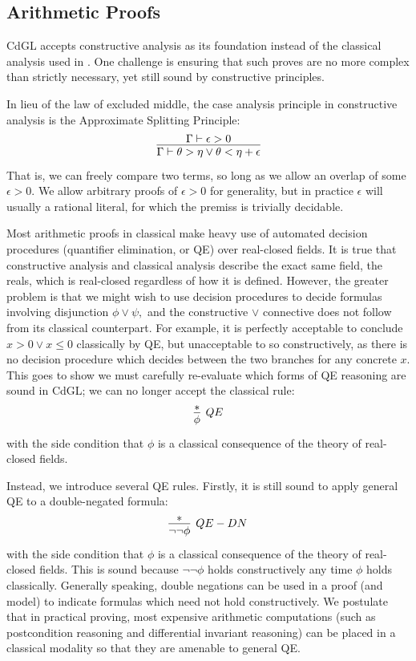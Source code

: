 \documentclass[12pt]{cmuthesis}
\theoremstyle{definition}
\theoremstyle{remark}
\newcommand{\CdGL}{\textsf{CdGL}\xspace}
\begin{document}
\subsection{Arithmetic Proofs}
\CdGL accepts constructive analysis as its foundation instead of the classical analysis used in \dGL.
One challenge is ensuring that such proves are no more complex than strictly necessary, yet still sound by constructive principles.

In lieu of the law of excluded middle, the case analysis principle in constructive analysis is the Approximate Splitting Principle:
\[\infer{\Gamma \vdash \theta > \eta \lor \theta < \eta + \epsilon}{\Gamma \vdash \epsilon > 0}\]
That is, we can freely compare two terms, so long as we allow an overlap of some $\epsilon > 0$.
We allow arbitrary proofs of $\epsilon > 0$ for generality, but in practice $\epsilon$ will usually a rational literal, for which the premiss is trivially decidable.

Most arithmetic proofs in classical \dGL make heavy use of automated decision procedures (quantifier elimination, or QE) over real-closed fields.
It is true that constructive analysis and classical analysis describe the exact same field, the reals, which is real-closed regardless of how it is defined.
However, the greater problem is that we might wish to use decision procedures to decide formulas involving disjunction $\phi \lor \psi,$ and the constructive $\lor$ connective does not follow from its classical counterpart.
For example, it is perfectly acceptable to conclude $x > 0 \lor x \leq 0$ classically by QE, but unacceptable to so constructively, as there is no decision procedure which decides between the two branches for any concrete $x$.
This goes to show we must carefully re-evaluate which forms of QE reasoning are sound in \CdGL; we can no longer accept the classical rule:
\[\infer[QE]{\phi}{*}\] with the side condition that $\phi$ is a classical consequence of the theory of real-closed fields.

Instead, we introduce several QE rules.
Firstly, it is still sound to apply general QE to a double-negated formula:
\[\infer[QE-DN]{\neg\neg\phi}{*}\] with the side condition that $\phi$ is a classical consequence of the theory of real-closed fields.
This is sound because $\neg\neg\phi$ holds constructively any time $\phi$ holds classically.
Generally speaking, double negations can be used in a proof (and model) to indicate formulas which need not hold constructively.
We postulate that in practical proving, most expensive arithmetic computations (such as postcondition reasoning and differential invariant reasoning) can be placed in a classical modality so that they are amenable to general QE.
\end{document}

